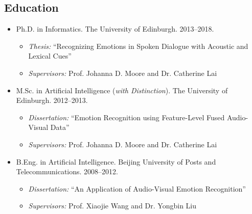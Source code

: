 \documentclass[11pt,letterpaper]{article}
\begin{document}
\subsection*{Education}
\begin{itemize}
  \item Ph.D. in Informatics. The University of Edinburgh. 2013--2018.
  \begin{itemize}
    \item \emph{Thesis:} ``Recognizing Emotions in Spoken Dialogue with Acoustic and Lexical Cues''
    \item \emph{Supervisors:} Prof. Johanna D. Moore and Dr. Catherine Lai
  \end{itemize}
  \item M.Sc. in Artificial Intelligence (\emph{with Distinction}). The University of Edinburgh. 2012--2013.
  \begin{itemize}
    \item \emph{Dissertation:} ``Emotion Recognition using Feature-Level Fused Audio-Visual Data''
    \item \emph{Supervisors:} Prof. Johanna D. Moore and Dr. Catherine Lai
  \end{itemize}
  \item B.Eng. in Artificial Intelligence. Beijing University of Posts and Telecommunications. 2008--2012.
  \begin{itemize}
    \item \emph{Dissertation:} ``An Application of Audio-Visual Emotion Recognition''
    \item \emph{Supervisors:} Prof. Xiaojie Wang and Dr. Yongbin Liu
  \end{itemize}
\end{itemize}
\end{document}
